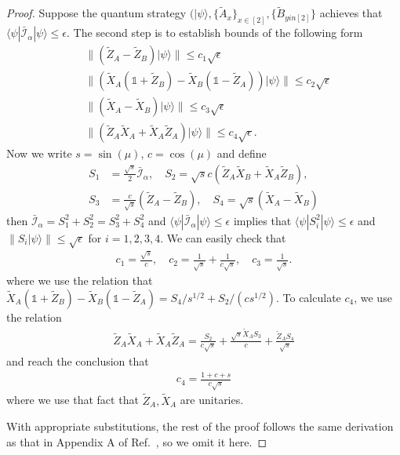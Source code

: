 \documentclass[11pt,letterpaper]{article}
\newcommand{\ket}[1]{|#1\rangle}
\newcommand{\bra}[1]{\langle#1|}
\newcommand{\1}{\mathbb{1}}
\newcommand{\I}{\mathcal{I}}
\theoremstyle{definition}
\begin{document}
\begin{proof}
Suppose the quantum strategy $(\ket{\psi}, \{\tilde{A}_x\}_{x \in [2]}, \{\tilde{B}_{y in [2]}\}$ achieves that 
$\bra{\psi} \bar{\I}_\alpha \ket{\psi} \leq \epsilon$.
The second step is to establish bounds of the following form
\begin{align}
	&\|(\tilde{Z}_A-\tilde{Z}_B)\ket{\psi}\| \leq c_1 \sqrt{\epsilon}\\
	&\|(\tilde{X}_A(\1+\tilde{Z}_B)-\tilde{X}_B(\1-\tilde{Z}_A))\ket{\psi}\| \leq c_2 \sqrt{\epsilon}\\
	&\|(\tilde{X}_A-\tilde{X}_B)\ket{\psi}\| \leq c_3 \sqrt{\epsilon}\\
	&\|(\tilde{Z}_A\tilde{X}_A+\tilde{X}_A\tilde{Z}_A)\ket{\psi}\| \leq c_4 \sqrt{\epsilon}.
\end{align}
Now we write $s = \sin(\mu)$, $c = \cos(\mu)$ and define
\begin{align*}
	S_1 &= \frac{\sqrt{s}}{2} \bar{\I}_\alpha, \quad
	S_2 = \sqrt{s}c(\tilde{Z}_A\tilde{X}_B+\tilde{X}_A\tilde{Z}_B),\\
	S_3 &= \frac{c}{\sqrt{s}}(\tilde{Z}_A-\tilde{Z}_B),\quad
	S_4 = \sqrt{s}(\tilde{X}_A-\tilde{X}_B)
\end{align*}
then $\bar{\I}_\alpha = S_1^2 + S_2^2 = S_3^2 + S_4^2$ and $\bra{\psi}\bar{\I}_\alpha \ket{\psi} \leq \epsilon$ implies that 
$\bra{\psi}S^2_i \ket{\psi} \leq \epsilon$ and $\|S_i \ket{\psi} \| \leq \sqrt{\epsilon}$ for $i = 1,2,3,4$.
We can easily check that 
\begin{align*}
	c_1 = \frac{\sqrt{s}}{c}, \quad
	c_2 = \frac{1}{\sqrt{s}} + \frac{1}{c\sqrt{s}}, \quad
	c_3 = \frac{1}{\sqrt{s}}.
\end{align*}
where we use the relation that $\tilde{X}_A(\1+\tilde{Z}_B)-\tilde{X}_B(\1-\tilde{Z}_A) = S_4/s^{1/2} + S_2/(cs^{1/2})$.
To calculate $c_4$, we use the relation
\begin{align}
	\tilde{Z}_A\tilde{X}_A + \tilde{X}_A\tilde{Z}_A = \frac{S_2}{c\sqrt{s}} + \frac{\sqrt{s}\tilde{X}_AS_3}{c} + \frac{\tilde{Z}_AS_4}{\sqrt{s}}
\end{align}
and reach the conclusion that  
\begin{align}
	c_4 = \frac{1+c+s}{c\sqrt{s}}
\end{align}
where we use that fact that $\tilde{Z}_A, \tilde{X}_A$ are unitaries.

With appropriate substitutions, the rest of the proof follows the same derivation as that in Appendix A of Ref.~\cite{bamps2015},
so we omit it here.
\end{proof}
\end{document}
